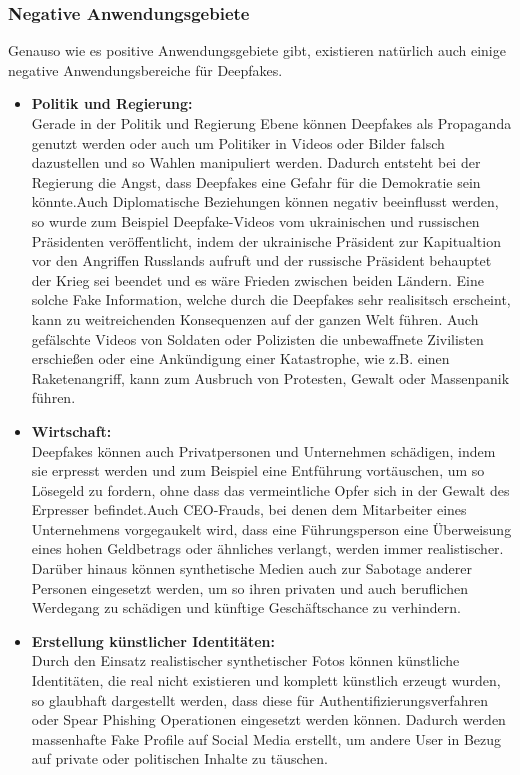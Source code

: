 \subsubsection*{Negative Anwendungsgebiete}
Genauso wie es positive Anwendungsgebiete gibt, existieren natürlich auch einige negative Anwendungsbereiche für Deepfakes.
\begin{itemize}
    \item \textbf{Politik und Regierung:} \\
    Gerade in der Politik und Regierung Ebene können Deepfakes als Propaganda genutzt werden oder auch um Politiker in Videos oder Bilder falsch dazustellen und so Wahlen manipuliert werden. Dadurch entsteht bei der Regierung die Angst, dass Deepfakes eine Gefahr für die Demokratie sein könnte.\cite{ResearchGate}\newline Auch Diplomatische Beziehungen können negativ beeinflusst werden, so wurde zum Beispiel Deepfake-Videos vom ukrainischen und russischen Präsidenten veröffentlicht, indem der ukrainische Präsident zur Kapitualtion vor den Angriffen Russlands aufruft und der russische Präsident behauptet der Krieg sei beendet und es wäre Frieden zwischen beiden Ländern. Eine solche Fake Information, welche durch die Deepfakes sehr realisitsch erscheint, kann zu weitreichenden Konsequenzen auf der ganzen Welt führen. Auch gefälschte Videos von Soldaten oder Polizisten die unbewaffnete Zivilisten erschießen oder eine Ankündigung einer Katastrophe, wie z.B. einen Raketenangriff, kann zum Ausbruch von Protesten, Gewalt oder Massenpanik führen.\cite{SpringerLink}
    \item \textbf{Wirtschaft:} \\
    Deepfakes können auch Privatpersonen und Unternehmen schädigen, indem sie erpresst werden und zum Beispiel eine Entführung vortäuschen, um so Lösegeld zu fordern, ohne dass das vermeintliche Opfer sich in der Gewalt des Erpresser befindet.\newline Auch CEO-Frauds, bei denen dem Mitarbeiter eines Unternehmens vorgegaukelt wird, dass eine Führungsperson eine Überweisung eines hohen Geldbetrags oder ähnliches verlangt, werden immer realistischer. Darüber hinaus können synthetische Medien auch zur Sabotage anderer Personen eingesetzt werden, um so ihren privaten und auch beruflichen Werdegang zu schädigen und künftige Geschäftschance zu verhindern.\cite{SpringerLink}
    \item \textbf{Erstellung künstlicher Identitäten:} \\
    Durch den Einsatz realistischer synthetischer Fotos können künstliche Identitäten, die real nicht existieren und komplett künstlich erzeugt wurden, so glaubhaft dargestellt werden, dass diese für Authentifizierungsverfahren oder Spear Phishing Operationen eingesetzt werden können. Dadurch werden massenhafte Fake Profile auf Social Media erstellt, um andere User in Bezug auf private oder politischen Inhalte zu täuschen.\cite{SpringerLink}

\end{itemize}
